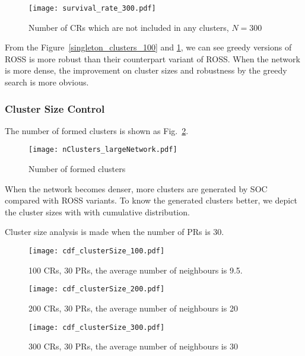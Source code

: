 \begin{figure}[h!]
  \centering
   \texttt{[image: survival\_rate\_300.pdf]}
  \caption{Number of CRs which are not included in any clusters, $N=300$}
  \label{singleton_clusters_300}
\end{figure}

From the Figure~\ref{singleton_clusters_100} and \ref{singleton_clusters_300}, we can see greedy versions of ROSS is more robust than their counterpart variant of ROSS.
When the network is more dense, the improvement on cluster sizes and robustness by the greedy search is more obvious.


\subsubsection{Cluster Size Control}

The number of formed clusters is shown as Fig.~\ref{nClusters_largeNetwork}.

\begin{figure}[h!]
  \centering
   \texttt{[image: nClusters\_largeNetwork.pdf]}
  \caption{Number of formed clusters}
  \label{nClusters_largeNetwork}
\end{figure}
When the network becomes denser, more clusters are generated by SOC compared with ROSS variants.
To know the generated clusters better, we depict the cluster sizes with with cumulative distribution.

Cluster size analysis is made when the number of PRs is 30.


\begin{figure}[h!]
  \centering
   \texttt{[image: cdf\_clusterSize\_100.pdf]}
  \caption{100 CRs, 30 PRs, the average number of neighbours is 9.5.}
  \label{cdf_clusterSize_100}
\end{figure}

\begin{figure}[h!]
  \centering
   \texttt{[image: cdf\_clusterSize\_200.pdf]}
  \caption{200 CRs, 30 PRs, the average number of neighbours is 20}
  \label{cdf_clusterSize_200}
\end{figure}


\begin{figure}[h!]
  \centering
   \texttt{[image: cdf\_clusterSize\_300.pdf]}
  \caption{300 CRs, 30 PRs, the average number of neighbours is 30}
  \label{cdf_clusterSize_300}
\end{figure}

